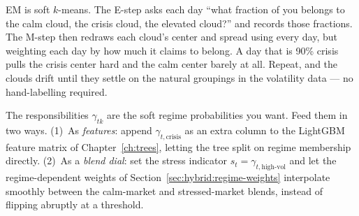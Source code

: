 \begin{intuition}
EM is soft $k$-means.  The E-step asks each day ``what fraction of you
belongs to the calm cloud, the crisis cloud, the elevated cloud?'' and
records those fractions.  The M-step then redraws each cloud's center and
spread using every day, but weighting each day by how much it claims to
belong.  A day that is 90\% crisis pulls the crisis center hard and the
calm center barely at all.  Repeat, and the clouds drift until they settle
on the natural groupings in the volatility data --- no hand-labelling
required.
\end{intuition}

\begin{projectconnection}
The responsibilities $\gamma_{tk}$ are the soft regime probabilities you
want.  Feed them in two ways.  (1)~As \emph{features}: append
$\gamma_{t,\text{crisis}}$ as an extra column to the LightGBM feature
matrix of Chapter~\ref{ch:trees}, letting the tree split on regime
membership directly.  (2)~As a \emph{blend dial}: set the stress indicator
$s_t = \gamma_{t,\text{high-vol}}$ and let the regime-dependent weights of
Section~\ref{sec:hybrid:regime-weights} interpolate smoothly between the
calm-market and stressed-market blends, instead of flipping abruptly at a
threshold.
\end{projectconnection}

